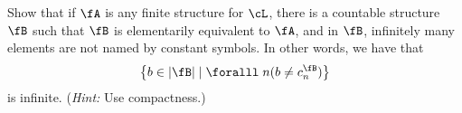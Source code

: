 \begin{problem}
  Show that if $\fA$ is any finite structure for $\cL$, there is a countable
  structure $\fB$ such that $\fB$ is elementarily equivalent to $\fA$,
  and in $\fB$, infinitely many elements are not named by constant symbols.
  In other words, we have that
  \[ \set{b \in \abs{\fB} \mid \forall n (b \ne c_n^\fB)} \] is infinite.
  (\emph{Hint: } Use compactness.)

\end{problem}
\begin{Answer}

\end{Answer}
